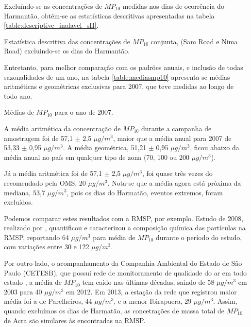 Excluíndo-se as concentrações de $MP_{10}$ medidas nos dias de ocorrência do 
Harmantão, obtém-se as estatísticas descritivas apresentadas na tabela 
\ref{table:descriptive_inalavel_sH}.

\begin{table}[H]
  \centering
  \caption{Estatística descritiva das concentrações de $MP_{10}$ conjunta, 
           (Sam Road e Nima Road) excluindo-se os dias do Harmantão.
            \label{table:descriptive_inalavel_sH}}
    
\end{table}

Entretanto, para melhor comparação com os padrões anuais, e inclusão de todas 
sazonalidades de um ano, na tabela \ref{table:mediasmp10} apresenta-se médias 
aritméticas e geométricas exclusivas para 2007, que teve medidas ao longo de 
todo ano.

\begin{table}[H]
  \centering
  \caption{Médias de $MP_{10}$ para o ano de 2007. \label{table:mediasmp10}}
  
\end{table}

A média aritmética da concentração de $MP_{10}$ durante a campanha de amostragem 
foi de 57,1 $\pm$ 2,5 $\mu g/ m^3$, maior que a média anual para 2007 de 
53,33 $\pm$ 0,95 $\mu g/ m^3$. A média geométrica, 51,21 $\pm$ 0,95 $\mu g/ m^3$, 
ficou abaixo da média anual no país em qualquer tipo de zona 
(70, 100 ou 200 $\mu g/ m^3$). 

Já a média aritmética foi de 57,1 $\pm$ 2,5 $\mu g/ m^3$, foi quase três vezes 
do recomendado pela OMS, 20 $\mu g/m^3$. Nota-se que a média agora está próxima
da mediana, 53,7 $\mu g/ m^3$, pois os dias do Harmatão, eventos extremos, 
foram excluídos. 

Podemos comparar estes resultados com a RMSP, por exemplo. Estudo de 2008, 
realizado por \citet{souza2014}, quantificou e caracterizou a composição química
das partículas na RMSP, reportando 64 $\mu g / m^3$ para média de $MP_{10}$ 
durante o período do estudo, com variações entre 30 e 122 $\mu g / m^3$.

Por outro lado, o acompanhamento da Companhia Ambiental do Estado de São Paulo 
(CETESB), que possui rede de monitoramento de qualidade do ar em todo estado 
\citep{cetesb2014}, a média de $MP_{10}$ tem caído nas últimas décadas, saindo 
de 58 $\mu g / m^3$ em 2003 para 40 $\mu g / m^3$ em 2012. Em 2013, a estação da
rede que registrou maior média foi a de Parelheiros, 44 $\mu g / m^3$, e a menor 
Ibirapuera, 29 $\mu g / m^3$. Assim, quando excluímos os dias de Harmatão, 
as concetrações de massa total de $MP_{10}$ de Acra são similares às encontradas
na RMSP.

